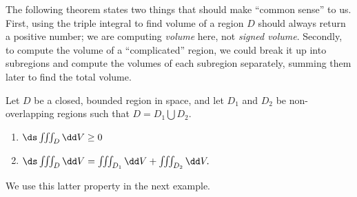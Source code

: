 The following theorem states two things that should make ``common sense'' to us. First, using the triple integral to find volume of a region $D$ should always return a positive number; we are computing \emph{volume} here, not \emph{signed volume}. Secondly, to compute the volume of a ``complicated'' region, we could break it up into subregions and compute the volumes of each subregion separately, summing them later to find the total volume.

\begin{theorem}\label{thm:triple_int_prop}
Let $D$ be a closed, bounded region in space, and let $D_1$ and $D_2$ be non-overlapping regions such that $D=D_1\bigcup D_2$.
\begin{enumerate}
	\item $\ds \iiint_D \dd V \geq 0$
	\item	$\ds \iiint_D\dd V = \iiint_{D_1}\dd V + \iiint_{D_2}\dd V.$
\end{enumerate}
\end{theorem}

We use this latter property in the next example.

